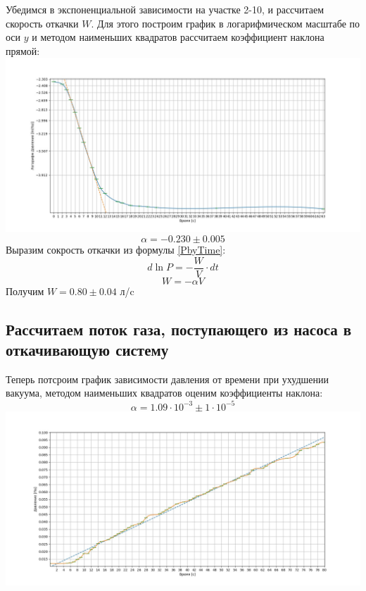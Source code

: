 \documentclass[a4paper, 12pt]{article}%
\begin{document}
Убедимся в экспоненциальной зависимости на участке 2-10, и рассчитаем скорость откачки $W$. Для этого построим график в логарифмическом масштабе по оси $y$ и методом наименьших квадратов рассчитаем коэффициент наклона прямой:\\
\includegraphics[scale = 0.3]{fig3.jpg}
\begin{equation}
\alpha = -0.230 \pm 0.005
\end{equation}
Выразим сокрость откачки из формулы \eqref{PbyTime}:
\begin{equation}\label{difflnP}
    d\ln{P} = -\frac{W}{V}\cdot dt
\end{equation}
\begin{equation}\label{W}
    W = -\alpha V
\end{equation}
Получим $W = 0.80 \pm 0.04$ л/c
\subsection{Рассчитаем поток газа, поступающего из насоса в откачивающую систему}

Теперь потсроим график зависимости давления от времени при ухудшении вакуума, методом наименьших квадратов оценим коэффициенты наклона:
\begin{equation}
    \alpha = 1.09 \cdot 10^{-3} \pm 1 \cdot 10^{-5}
\end{equation}
\includegraphics[scale = 0.3]{fig1.jpg}
\end{document}
